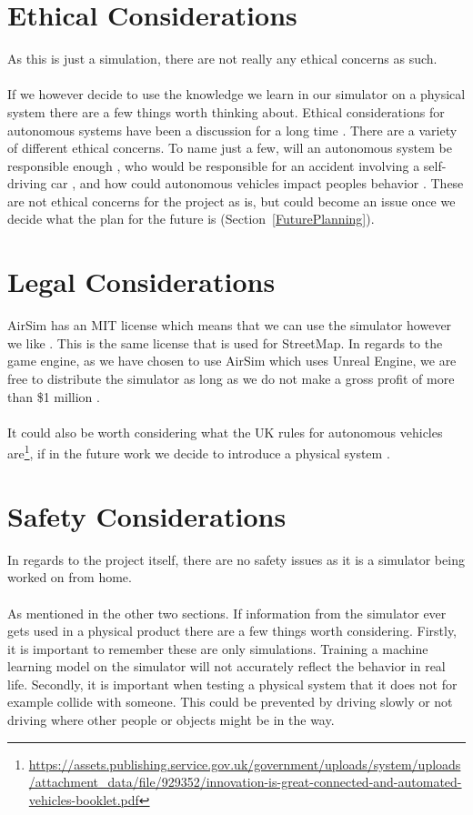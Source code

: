 \section{Ethical Considerations}
As this is just a simulation, there are not really any ethical concerns as such. 
\\~\\
If we however decide to use the knowledge we learn in our simulator on a physical system there are a few things worth thinking about. Ethical considerations for autonomous systems have been a discussion for a long time \cite{ArkinRonaldC2016EaAS, BorensteinJason2019SCaE}. There are a variety of different ethical concerns. To name just a few, will an autonomous system be responsible enough \cite{BorensteinJason2019SCaE}, who would be responsible for an accident involving a self-driving car \cite{Hevelke2015, EthicsIssue}, and how could autonomous vehicles impact peoples behavior \cite{moralComputers}. These are not ethical concerns for the project as is, but could become an issue once we decide what the plan for the future is (Section~\ref{FuturePlanning}). 

\section{Legal Considerations}
AirSim has an MIT license which means that we can use the simulator however we like \cite{MITLicense}. This is the same license that is used for StreetMap. In regards to the game engine, as we have chosen to use AirSim which uses Unreal Engine, we are free to distribute the simulator as long as we do not make a gross profit of more than \$1 million \cite{UE5}. 
\\~\\
It could also be worth considering what the UK rules for autonomous vehicles are\footnote{\url{https://assets.publishing.service.gov.uk/government/uploads/system/uploads/attachment_data/file/929352/innovation-is-great-connected-and-automated-vehicles-booklet.pdf}}, if in the future work we decide to introduce a physical system \cite{UKAutoRules, UKAutoRulesGov2}. 


\section{Safety Considerations}
In regards to the project itself, there are no safety issues as it is a simulator being worked on from home. 
\\~\\
As mentioned in the other two sections. If information from the simulator ever gets used in a physical product there are a few things worth considering. Firstly, it is important to remember these are only simulations. Training a machine learning model on the simulator will not accurately reflect the behavior in real life. Secondly, it is important when testing a physical system that it does not for example collide with someone. This could be prevented by driving slowly or not driving where other people or objects might be in the way.